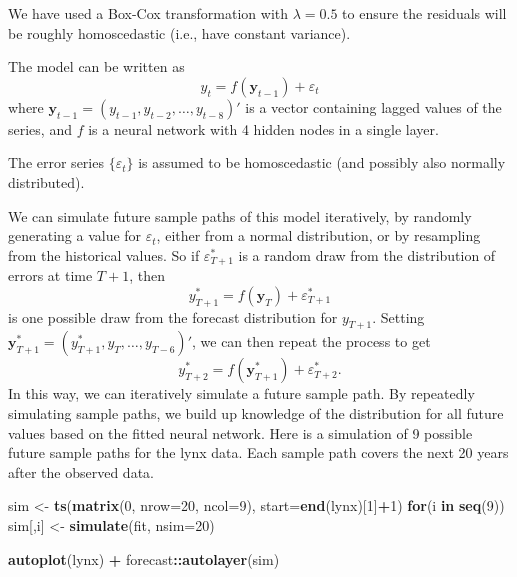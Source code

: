 \documentclass[]{book}
\newenvironment{Shaded}{\begin{snugshade}}{\end{snugshade}}
\newcommand{\ControlFlowTok}[1]{\textcolor[rgb]{0.13,0.29,0.53}{\textbf{#1}}}
\newcommand{\DataTypeTok}[1]{\textcolor[rgb]{0.13,0.29,0.53}{#1}}
\newcommand{\DecValTok}[1]{\textcolor[rgb]{0.00,0.00,0.81}{#1}}
\newcommand{\KeywordTok}[1]{\textcolor[rgb]{0.13,0.29,0.53}{\textbf{#1}}}
\newcommand{\NormalTok}[1]{#1}
\newcommand{\OperatorTok}[1]{\textcolor[rgb]{0.81,0.36,0.00}{\textbf{#1}}}
\newcommand{\StringTok}[1]{\textcolor[rgb]{0.31,0.60,0.02}{#1}}
\begin{document}
We have used a Box-Cox transformation with \(\lambda=0.5\) to ensure the residuals will be roughly homoscedastic (i.e., have constant variance).

The model can be written as
\[
  y_t = f(\boldsymbol{y}_{t-1}) + \varepsilon_t
\]
where \(\boldsymbol{y}_{t-1} = (y_{t-1},y_{t-2},\dots,y_{t-8})'\) is a vector containing lagged values of the series, and \(f\) is a neural network with 4 hidden nodes in a single layer.

The error series \(\{\varepsilon_t\}\) is assumed to be homoscedastic (and possibly also normally distributed).

We can simulate future sample paths of this model iteratively, by randomly generating a value for \(\varepsilon_t\), either from a normal distribution, or by resampling from the historical values. So if \(\varepsilon^*_{T+1}\) is a random draw from the distribution of errors at time \(T+1\), then
\[
  y^*_{T+1} = f(\boldsymbol{y}_{T}) + \varepsilon^*_{T+1}
\]
is one possible draw from the forecast distribution for \(y_{T+1}\). Setting
\(\boldsymbol{y}_{T+1}^* = (y^*_{T+1}, y_{T}, \dots, y_{T-6})'\), we can then repeat the process to get
\[
  y^*_{T+2} = f(\boldsymbol{y}^*_{T+1}) + \varepsilon^*_{T+2}.
\]
In this way, we can iteratively simulate a future sample path. By repeatedly simulating sample paths, we build up knowledge of the distribution for all future values based on the fitted neural network. Here is a simulation of 9 possible future sample paths for the lynx data. Each sample path covers the next 20 years after the observed data.

\begin{Shaded}
\begin{Highlighting}[]
\NormalTok{sim <-}\StringTok{ }\KeywordTok{ts}\NormalTok{(}\KeywordTok{matrix}\NormalTok{(}\DecValTok{0}\NormalTok{, }\DataTypeTok{nrow=}\DecValTok{20}\NormalTok{, }\DataTypeTok{ncol=}\DecValTok{9}\NormalTok{), }\DataTypeTok{start=}\KeywordTok{end}\NormalTok{(lynx)[}\DecValTok{1}\NormalTok{]}\OperatorTok{+}\DecValTok{1}\NormalTok{)}
\ControlFlowTok{for}\NormalTok{(i }\ControlFlowTok{in} \KeywordTok{seq}\NormalTok{(}\DecValTok{9}\NormalTok{))}
\NormalTok{  sim[,i] <-}\StringTok{ }\KeywordTok{simulate}\NormalTok{(fit, }\DataTypeTok{nsim=}\DecValTok{20}\NormalTok{)}

\KeywordTok{autoplot}\NormalTok{(lynx) }\OperatorTok{+}\StringTok{ }\NormalTok{forecast}\OperatorTok{::}\KeywordTok{autolayer}\NormalTok{(sim)}
\end{Highlighting}
\end{Shaded}
\end{document}

